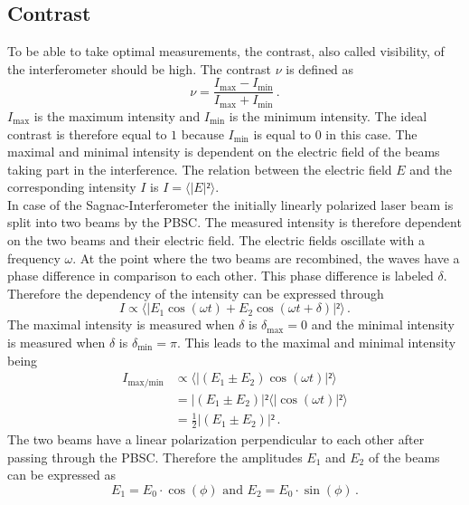   \subsection{Contrast}
  To be able to take optimal measurements, the contrast, also called visibility, of the interferometer should be high. 
  The contrast $\nu$ is defined
   as 
  \begin{equation}
    \nu = \frac{I_{\text{max}}- I_{\text{min}}}{I_{\text{max}}+ I_{\text{min}}}\, .
    \label{eqn:contrast}
  \end{equation}
 $I_{\text{max}}$ is the maximum intensity and $I_{\text{min}}$ is the minimum intensity. The ideal contrast is therefore equal to $1$ because
 $I_{\text{min}}$ is equal to $0$ in this case. The maximal and minimal intensity is dependent on the electric field of the beams taking 
 part in the interference. The relation between the electric field $E$ and the corresponding intensity $I$ is $I = \langle |E|² \rangle$. \\
 In case of the Sagnac-Interferometer the initially linearly polarized laser beam is split into two beams by the PBSC. The measured 
 intensity is therefore dependent on the two beams and their electric field. The electric fields oscillate with a frequency $\omega$. 
 At the point where the two beams are recombined, the waves have a phase difference in comparison to each other. This phase difference
 is labeled $\delta$. Therefore the dependency of the intensity can be expressed through
 \begin{equation*}
    I \propto \langle |E_1 \cos(\omega t) + E_2 \cos(\omega t + \delta)|²\rangle \, .
 \end{equation*}
 The maximal intensity is measured when $\delta$ is $\delta_{\text{max}} = 0$ and the minimal intensity is
 measured when $\delta$ is $\delta_{\text{min}} = \pi$. 
 This leads to the maximal and minimal intensity being 
 \begin{align*}
    I_{\text{max/min}} &\propto \langle |(E_1 \pm E_2) \cos(\omega t)|²\rangle \\
    &= |(E_1 \pm E_2)|² \langle |\cos(\omega t)|²\rangle \\
    &= \frac{1}{2} |(E_1 \pm E_2)|² \, .
 \end{align*}
 The two beams have a linear polarization perpendicular to each other after passing through the PBSC. 
 Therefore the amplitudes $E_1$ and $E_2$ of the beams can be expressed as 
 \begin{equation}
    E_1 = E_0 \cdot \cos(\phi) \,\, \text{and} \,\, E_2 = E_0 \cdot \sin(\phi) \, .
    \label{eqn:E_Felder}
 \end{equation}
